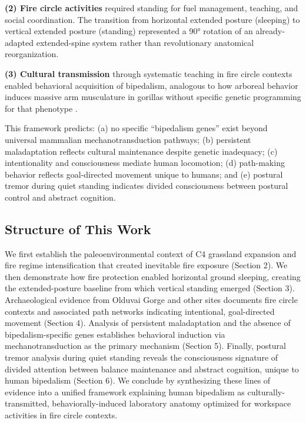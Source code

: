 \documentclass[12pt,a4paper]{article}
\begin{document}
\textbf{(2) Fire circle activities} required standing for fuel management, teaching, and social coordination. The transition from horizontal extended posture (sleeping) to vertical extended posture (standing) represented a 90° rotation of an already-adapted extended-spine system rather than revolutionary anatomical reorganization.

\textbf{(3) Cultural transmission} through systematic teaching in fire circle contexts enabled behavioral acquisition of bipedalism, analogous to how arboreal behavior induces massive arm musculature in gorillas without specific genetic programming for that phenotype \citep{scholz2006vertical,myatt2011hindlimb}.

This framework predicts: (a) no specific ``bipedalism genes'' exist beyond universal mammalian mechanotransduction pathways; (b) persistent maladaptation reflects cultural maintenance despite genetic inadequacy; (c) intentionality and consciousness mediate human locomotion; (d) path-making behavior reflects goal-directed movement unique to humans; and (e) postural tremor during quiet standing indicates divided consciousness between postural control and abstract cognition.

\subsection{Structure of This Work}

We first establish the paleoenvironmental context of C4 grassland expansion and fire regime intensification that created inevitable fire exposure (Section 2). We then demonstrate how fire protection enabled horizontal ground sleeping, creating the extended-posture baseline from which vertical standing emerged (Section 3). Archaeological evidence from Olduvai Gorge and other sites documents fire circle contexts and associated path networks indicating intentional, goal-directed movement (Section 4). Analysis of persistent maladaptation and the absence of bipedalism-specific genes establishes behavioral induction via mechanotransduction as the primary mechanism (Section 5). Finally, postural tremor analysis during quiet standing reveals the consciousness signature of divided attention between balance maintenance and abstract cognition, unique to human bipedalism (Section 6). We conclude by synthesizing these lines of evidence into a unified framework explaining human bipedalism as culturally-transmitted, behaviorally-induced laboratory anatomy optimized for workspace activities in fire circle contexts.
\end{document}
